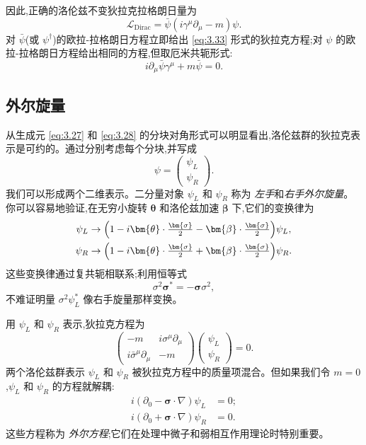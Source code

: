因此,正确的洛伦兹不变狄拉克拉格朗日量为
\begin{equation}
  \mathcal{L}_{\mathrm{Dirac}} = \bar{\psi}(i\gamma^\mu\partial_\mu
    - m)\psi .
  \label{eq:3.36}
\end{equation}
对 $\bar{\psi}$(或 $\psi^\dagger$)的欧拉-拉格朗日方程立即给出 \eqref{eq:3.33} 形式的狄拉克方程;对 $\psi$ 的欧拉-拉格朗日方程给出相同的方程,但取厄米共轭形式:
\begin{equation}
  i\partial_\mu\bar{\psi}\gamma^\mu + m\bar{\psi} = 0 .
  \label{eq:3.37}
\end{equation}

\subsection{外尔旋量}

从生成元 \eqref{eq:3.27} 和 \eqref{eq:3.28} 的分块对角形式可以明显看出,洛伦兹群的狄拉克表示是可约的。通过分别考虑每个分块,并写成
\begin{equation}
  \psi = \begin{pmatrix}\psi_L\\ \psi_R\end{pmatrix}.
  \label{eq:3.38}
\end{equation}
我们可以形成两个二维表示。二分量对象 $\psi_L$ 和 $\psi_R$ 称为 \emph{左手}和\emph{右手外尔旋量}。你可以容易地验证,在无穷小旋转 $\bm{\theta}$ 和洛伦兹加速 $\bm{\beta}$ 下,它们的变换律为
\begin{align}
  \psi_L &\to \Bigl( 1 - i\bm{\theta}\cdot\tfrac{\bm{\sigma}}{2}
    - \bm{\beta}\cdot\tfrac{\bm{\sigma}}{2} \Bigr)\psi_L,\\
  \psi_R &\to \Bigl( 1 - i\bm{\theta}\cdot\tfrac{\bm{\sigma}}{2}
    + \bm{\beta}\cdot\tfrac{\bm{\sigma}}{2} \Bigr)\psi_R .
  \label{eq:3.39}
\end{align}
这些变换律通过复共轭相联系;利用恒等式
\begin{equation}
  \sigma^2\bm{\sigma}^{*} = -\bm{\sigma}\sigma^2,
  \label{eq:3.40}
\end{equation}
不难证明量 $\sigma^2\psi_L^{*}$ 像右手旋量那样变换。

用 $\psi_L$ 和 $\psi_R$ 表示,狄拉克方程为
\begin{equation}
  \begin{pmatrix}
    -m & i\sigma^\mu\partial_\mu\\
    i\bar{\sigma}^\mu\partial_\mu & -m
  \end{pmatrix}
  \begin{pmatrix}\psi_L\\ \psi_R\end{pmatrix} = 0 .
  \label{eq:3.41}
\end{equation}
两个洛伦兹群表示 $\psi_L$ 和 $\psi_R$ 被狄拉克方程中的质量项混合。但如果我们令 $m=0$,$\psi_L$ 和 $\psi_R$ 的方程就解耦:
\begin{align}
  i(\partial_0 - \bm{\sigma}\cdot\nabla)\psi_L &= 0;\\
  i(\partial_0 + \bm{\sigma}\cdot\nabla)\psi_R &= 0 .
  \label{eq:3.42}
\end{align}
这些方程称为 \emph{外尔方程};它们在处理中微子和弱相互作用理论时特别重要。

